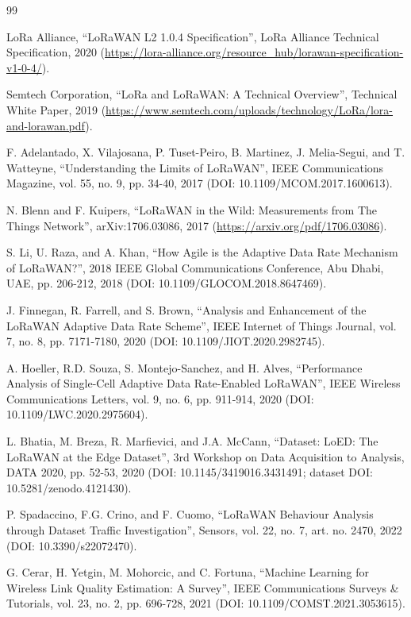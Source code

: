 \documentclass{jot}
\begin{document}
\begin{thebibliography}{99}

 LoRa Alliance, ``LoRaWAN L2 1.0.4 Specification'', LoRa Alliance Technical Specification, 2020 (\url{https://lora-alliance.org/resource_hub/lorawan-specification-v1-0-4/}).

 Semtech Corporation, ``LoRa and LoRaWAN: A Technical Overview'', Technical White Paper, 2019 (\url{https://www.semtech.com/uploads/technology/LoRa/lora-and-lorawan.pdf}).

 F. Adelantado, X. Vilajosana, P. Tuset-Peiro, B. Martinez, J. Melia-Segui, and T. Watteyne, ``Understanding the Limits of LoRaWAN'', IEEE Communications Magazine, vol. 55, no. 9, pp. 34-40, 2017 (DOI: 10.1109/MCOM.2017.1600613).

 N. Blenn and F. Kuipers, ``LoRaWAN in the Wild: Measurements from The Things Network'', arXiv:1706.03086, 2017 (\url{https://arxiv.org/pdf/1706.03086}).

 S. Li, U. Raza, and A. Khan, ``How Agile is the Adaptive Data Rate Mechanism of LoRaWAN?'', 2018 IEEE Global Communications Conference, Abu Dhabi, UAE, pp. 206-212, 2018 (DOI: 10.1109/GLOCOM.2018.8647469).

 J. Finnegan, R. Farrell, and S. Brown, ``Analysis and Enhancement of the LoRaWAN Adaptive Data Rate Scheme'', IEEE Internet of Things Journal, vol. 7, no. 8, pp. 7171-7180, 2020 (DOI: 10.1109/JIOT.2020.2982745).

 A. Hoeller, R.D. Souza, S. Montejo-Sanchez, and H. Alves, ``Performance Analysis of Single-Cell Adaptive Data Rate-Enabled LoRaWAN'', IEEE Wireless Communications Letters, vol. 9, no. 6, pp. 911-914, 2020 (DOI: 10.1109/LWC.2020.2975604).

 L. Bhatia, M. Breza, R. Marfievici, and J.A. McCann, ``Dataset: LoED: The LoRaWAN at the Edge Dataset'', 3rd Workshop on Data Acquisition to Analysis, DATA 2020, pp. 52-53, 2020 (DOI: 10.1145/3419016.3431491; dataset DOI: 10.5281/zenodo.4121430).

 P. Spadaccino, F.G. Crino, and F. Cuomo, ``LoRaWAN Behaviour Analysis through Dataset Traffic Investigation'', Sensors, vol. 22, no. 7, art. no. 2470, 2022 (DOI: 10.3390/s22072470).

 G. Cerar, H. Yetgin, M. Mohorcic, and C. Fortuna, ``Machine Learning for Wireless Link Quality Estimation: A Survey'', IEEE Communications Surveys \& Tutorials, vol. 23, no. 2, pp. 696-728, 2021 (DOI: 10.1109/COMST.2021.3053615).


\end{thebibliography}
\end{document}

